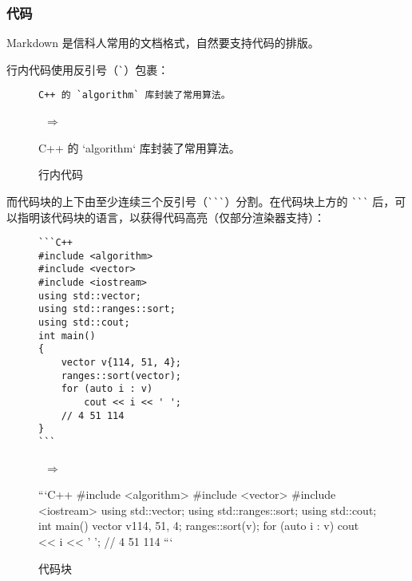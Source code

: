 \documentclass[a4paper,fontset=none]{ctexart}
\begin{document}
\subsubsection{代码}

Markdown 是信科人常用的文档格式，自然要支持代码的排版。

行内代码使用反引号（\verb|`|）包裹：

\begin{figure}[H]
    \centering
    \begin{minipage}{0.45\textwidth}
        \begin{verbatim}
C++ 的 `algorithm` 库封装了常用算法。
        \end{verbatim}
    \end{minipage}
    \, $\Longrightarrow$ \,
    \begin{minipage}{0.45\textwidth}
\begin{markdown}
C++ 的 `algorithm` 库封装了常用算法。
\end{markdown}
    \end{minipage}
    \caption{行内代码}
\end{figure}

而代码块的上下由至少连续三个反引号（\verb|```|）分割。在代码块上方的 \verb|```| 后，可以指明该代码块的语言，以获得代码高亮（仅部分渲染器支持）：

\begin{figure}[H]
    \centering
    \begin{minipage}{0.45\textwidth}
        \begin{verbatim}
```C++
#include <algorithm>
#include <vector>
#include <iostream>
using std::vector;
using std::ranges::sort;
using std::cout;
int main()
{
    vector v{114, 51, 4};
    ranges::sort(vector);
    for (auto i : v)
        cout << i << ' ';
    // 4 51 114
}
```
        \end{verbatim}
    \end{minipage}
    \, $\Longrightarrow$ \,
    \begin{minipage}{0.45\textwidth}
\begin{markdown}
```C++
#include <algorithm>
#include <vector>
#include <iostream>
using std::vector;
using std::ranges::sort;
using std::cout;
int main()
{
    vector v{114, 51, 4};
    ranges::sort(v);
    for (auto i : v)
        cout << i << ' ';
    // 4 51 114
}
```
\end{markdown}
    \end{minipage}
    \caption{代码块}
\end{figure}
\end{document}
